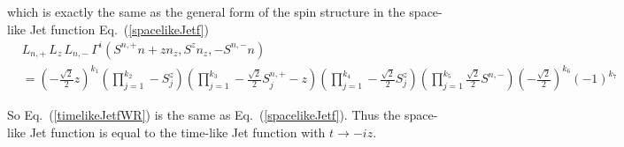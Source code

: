 \documentclass[a4paper,11pt]{article}
\begin{document}
which is exactly the same as the general form of the spin structure in the space-like Jet function Eq.~(\ref{spacelikeJetf})
\begin{align}
&L_{n,+}\, L_{z} \, L_{n,-} \, \Gamma^{i}(S^{n,+} n + z n_z,S^{z} n_z,-S^{n,-} n) \nonumber\\
&= \left(-\frac{\sqrt{2}}{2}z \right)^{k_1} 
\left(\prod^{k_2}_{j=1} -S_j^{z}\right) 
\left(\prod^{k_3}_{j=1} -\frac{\sqrt{2}}{2} S_{j}^{n,+} -z \right) 
\left(\prod^{k_4}_{j=1} -\frac{\sqrt{2}}{2} S_j^{z} \right) 
\left(\prod^{k_5}_{j=1} \frac{\sqrt{2}}{2} S^{n,-}\right)
\left(-\frac{\sqrt{2}}{2} \right)^{k_6}
\left(-1 \right)^{k_7}
\end{align}

So Eq.~(\ref{timelikeJetfWR}) is the same as Eq.~(\ref{spacelikeJetf}). Thus the space-like Jet function is equal to the time-like Jet function with $t \rightarrow -i z$.
\end{document}
